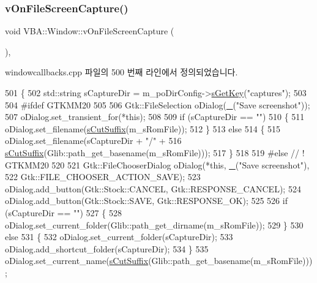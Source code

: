 \subsubsection{\texorpdfstring{v\+On\+File\+Screen\+Capture()}{vOnFileScreenCapture()}}
{\footnotesize\ttfamily void V\+B\+A\+::\+Window\+::v\+On\+File\+Screen\+Capture (\begin{DoxyParamCaption}{ }\end{DoxyParamCaption})\hspace{0.3cm}{\ttfamily [protected]}, {\ttfamily [virtual]}}



windowcallbacks.\+cpp 파일의 500 번째 라인에서 정의되었습니다.


\begin{DoxyCode}
501 \{
502   std::string sCaptureDir = m\_poDirConfig->\mbox{\hyperlink{class_v_b_a_1_1_config_1_1_section_a7ac9dfabf38bc1db83a6017e130f04ac}{sGetKey}}(\textcolor{stringliteral}{"captures"});
503 
504 \textcolor{preprocessor}{#ifdef GTKMM20}
505 
506   Gtk::FileSelection oDialog(\mbox{\hyperlink{getopt_8c_a86a239addea586602343007a370bf8ad}{\_}}(\textcolor{stringliteral}{"Save screenshot"}));
507   oDialog.set\_transient\_for(*\textcolor{keyword}{this});
508 
509   \textcolor{keywordflow}{if} (sCaptureDir == \textcolor{stringliteral}{""})
510   \{
511     oDialog.set\_filename(\mbox{\hyperlink{namespace_v_b_a_ad362cd74dbe4234578a0a124f3522dcf}{sCutSuffix}}(m\_sRomFile));
512   \}
513   \textcolor{keywordflow}{else}
514   \{
515     oDialog.set\_filename(sCaptureDir + \textcolor{stringliteral}{"/"} +
516                          \mbox{\hyperlink{namespace_v_b_a_ad362cd74dbe4234578a0a124f3522dcf}{sCutSuffix}}(Glib::path\_get\_basename(m\_sRomFile)));
517   \}
518 
519 \textcolor{preprocessor}{#else // ! GTKMM20}
520 
521   Gtk::FileChooserDialog oDialog(*\textcolor{keyword}{this}, \mbox{\hyperlink{getopt_8c_a86a239addea586602343007a370bf8ad}{\_}}(\textcolor{stringliteral}{"Save screenshot"}),
522                                  Gtk::FILE\_CHOOSER\_ACTION\_SAVE);
523   oDialog.add\_button(Gtk::Stock::CANCEL, Gtk::RESPONSE\_CANCEL);
524   oDialog.add\_button(Gtk::Stock::SAVE,   Gtk::RESPONSE\_OK);
525 
526   \textcolor{keywordflow}{if} (sCaptureDir == \textcolor{stringliteral}{""})
527   \{
528     oDialog.set\_current\_folder(Glib::path\_get\_dirname(m\_sRomFile));
529   \}
530   \textcolor{keywordflow}{else}
531   \{
532     oDialog.set\_current\_folder(sCaptureDir);
533     oDialog.add\_shortcut\_folder(sCaptureDir);
534   \}
535   oDialog.set\_current\_name(\mbox{\hyperlink{namespace_v_b_a_ad362cd74dbe4234578a0a124f3522dcf}{sCutSuffix}}(Glib::path\_get\_basename(m\_sRomFile)));

\end{DoxyCode}
